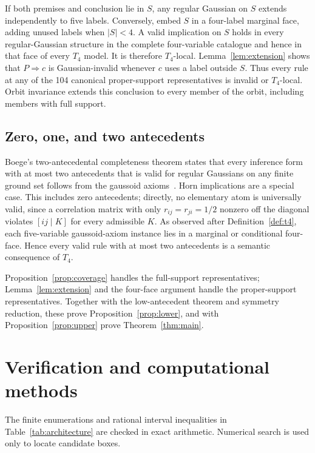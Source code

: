 \documentclass[10pt]{article}
\theoremstyle{definition}
\newcommand{\Tfour}{T_4}
\begin{document}
If both premises and conclusion lie in $S$, any regular Gaussian on $S$ extends independently to five labels.  Conversely, embed $S$ in a four-label marginal face, adding unused labels when $|S|<4$.  A valid implication on $S$ holds in every regular-Gaussian structure in the complete four-variable catalogue and hence in that face of every $\Tfour$ model.  It is therefore $\Tfour$-local.  Lemma~\ref{lem:extension} shows that $P\Rightarrow c$ is Gaussian-invalid whenever $c$ uses a label outside $S$.  Thus every rule at any of the 104 canonical proper-support representatives is invalid or $\Tfour$-local.  Orbit invariance extends this conclusion to every member of the orbit, including members with full support.

\subsection{Zero, one, and two antecedents}

Boege's two-antecedental completeness theorem states that every inference form with at most two antecedents that is valid for regular Gaussians on any finite ground set follows from the gaussoid axioms~\cite{Boege2022,BoegeCorrection2022}.  Horn implications are a special case.  This includes zero antecedents; directly, no elementary atom is universally valid, since a correlation matrix with only $r_{ij}=r_{ji}=1/2$ nonzero off the diagonal violates $[ij\mid K]$ for every admissible $K$.  As observed after Definition~\ref{def:t4}, each five-variable gaussoid-axiom instance lies in a marginal or conditional four-face.  Hence every valid rule with at most two antecedents is a semantic consequence of $\Tfour$.

Proposition~\ref{prop:coverage} handles the full-support representatives; Lemma~\ref{lem:extension} and the four-face argument handle the proper-support representatives.  Together with the low-antecedent theorem and symmetry reduction, these prove Proposition~\ref{prop:lower}, and with Proposition~\ref{prop:upper} prove Theorem~\ref{thm:main}.

\section{Verification and computational methods}\label{sec:verification}

The finite enumerations and rational interval inequalities in Table~\ref{tab:architecture} are checked in exact arithmetic.  Numerical search is used only to locate candidate boxes.
\end{document}
